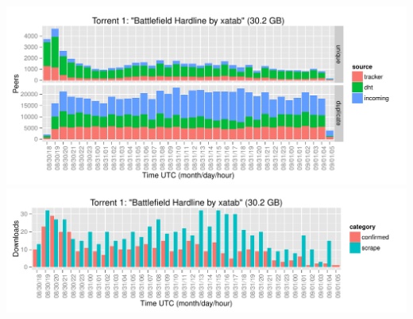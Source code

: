 \documentclass[10pt, a4paper, twoside=false, headsepline]{scrbook}
\renewcommand{\_}{\origunderscore\allowbreak}
\begin{document}
\begin{minipage}{\textwidth}
\includegraphics[width=\textwidth, page=\value{TorrentPage}]{../result/2015-08-30_20-combined_source_per_torrent}
\includegraphics[width=\textwidth, page=\value{TorrentPage}]{../result/2015-08-30_20-combined_download_each}
\end{minipage}
\end{document}
